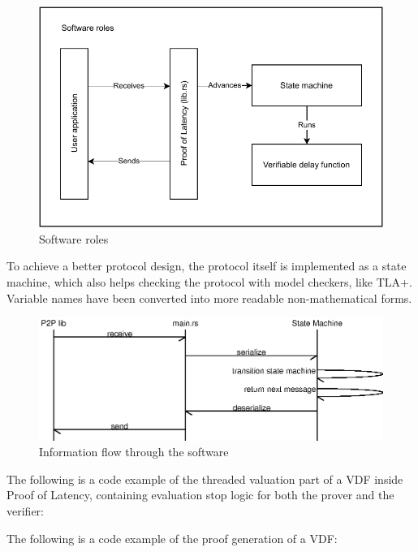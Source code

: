 \begin{figure}
  \includegraphics[width=\textwidth]{pictures/PoL_software_roles.pdf}
  \caption{Software roles}
  \label{software_roles}
\end{figure}

To achieve a better protocol design, the protocol itself is implemented as a state machine, which also helps checking the protocol with model checkers, like TLA+. Variable names have been converted into more readable non-mathematical forms.

\begin{figure}
  \includegraphics[width=\textwidth]{pictures/message_flow.eps}
  \caption{Information flow through the software}
  \label{message_flow}
\end{figure}

The following is a code example of the threaded valuation part of a VDF inside Proof of Latency, containing evaluation stop logic for both the prover and the verifier:


The following is a code example of the proof generation of a VDF:

